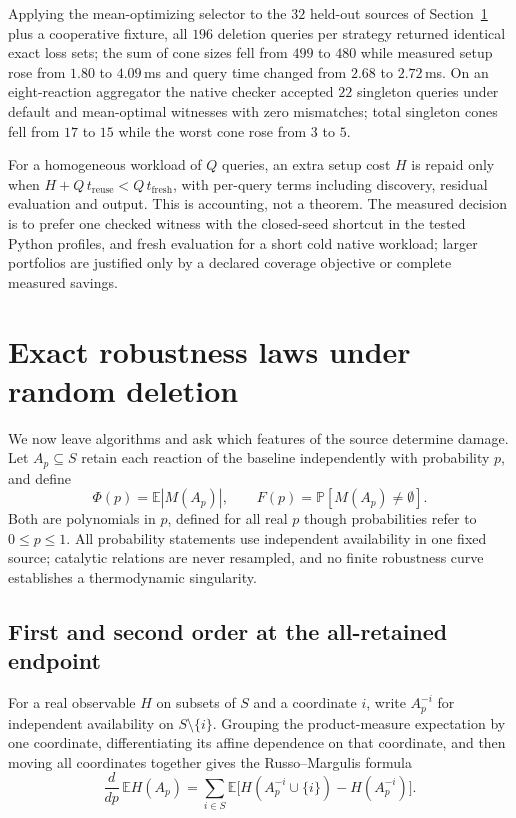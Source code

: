 \documentclass[11pt,a4paper]{article}
\theoremstyle{plain}
\theoremstyle{definition}
\theoremstyle{remark}
\newcommand{\E}{\mathbb{E}}
\renewcommand{\Pr}{\mathbb{P}}
\begin{document}
Applying the mean-optimizing selector to the $32$ held-out sources of Section~\ref{sec:robustness} plus a cooperative fixture, all $196$ deletion queries per strategy returned identical exact loss sets; the sum of cone sizes fell from $499$ to $480$ while measured setup rose from $1.80$ to $4.09$\,ms and query time changed from $2.68$ to $2.72$\,ms. On an eight-reaction aggregator the native checker accepted $22$ singleton queries under default and mean-optimal witnesses with zero mismatches; total singleton cones fell from $17$ to $15$ while the worst cone rose from $3$ to $5$.

For a homogeneous workload of $Q$ queries, an extra setup cost $H$ is repaid only when $H+Q\,t_{\mathrm{reuse}}<Q\,t_{\mathrm{fresh}}$, with per-query terms including discovery, residual evaluation and output. This is accounting, not a theorem. The measured decision is to prefer one checked witness with the closed-seed shortcut in the tested Python profiles, and fresh evaluation for a short cold native workload; larger portfolios are justified only by a declared coverage objective or complete measured savings.

\section{Exact robustness laws under random deletion}\label{sec:robustness}

We now leave algorithms and ask which features of the source determine damage. Let $A_p\subseteq S$ retain each reaction of the baseline independently with probability $p$, and define
\[
\Phi(p)=\E|M(A_p)|,\qquad F(p)=\Pr[M(A_p)\neq\emptyset].
\]
Both are polynomials in $p$, defined for all real $p$ though probabilities refer to $0\le p\le1$. All probability statements use independent availability in one fixed source; catalytic relations are never resampled, and no finite robustness curve establishes a thermodynamic singularity.

\subsection{First and second order at the all-retained endpoint}

For a real observable $H$ on subsets of $S$ and a coordinate $i$, write $A_p^{-i}$ for independent availability on $S\setminus\{i\}$. Grouping the product-measure expectation by one coordinate, differentiating its affine dependence on that coordinate, and then moving all coordinates together gives the Russo--Margulis formula \citep{margulis1974,russo1981,odonnell2014}
\begin{equation}\label{eq:russo}
\frac{d}{dp}\,\E H(A_p)=\sum_{i\in S}\E\big[H(A_p^{-i}\cup\{i\})-H(A_p^{-i})\big].
\end{equation}
\end{document}
